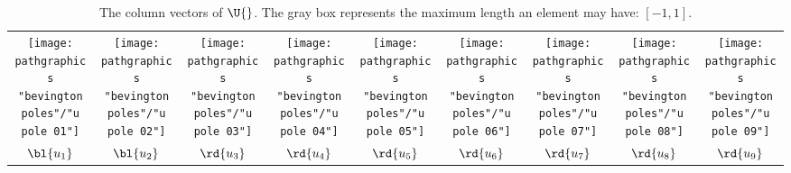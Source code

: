 \begin{table}[t]
	\begin{center}
		\begin{tabular}{ccccccccc}
			\texttt{[image: \\pathgraphics "bevington poles"/"u pole 01"]} &
			\texttt{[image: \\pathgraphics "bevington poles"/"u pole 02"]} &
			\texttt{[image: \\pathgraphics "bevington poles"/"u pole 03"]} &
			\texttt{[image: \\pathgraphics "bevington poles"/"u pole 04"]} &
			\texttt{[image: \\pathgraphics "bevington poles"/"u pole 05"]} &
			\texttt{[image: \\pathgraphics "bevington poles"/"u pole 06"]} &
			\texttt{[image: \\pathgraphics "bevington poles"/"u pole 07"]} &
			\texttt{[image: \\pathgraphics "bevington poles"/"u pole 08"]} &
			\texttt{[image: \\pathgraphics "bevington poles"/"u pole 09"]} \\
		  $\bl{u_{1}}$ & $\bl{u_{2}}$ & $\rd{u_{3}}$ & $\rd{u_{4}}$ & $\rd{u_{5}}$ & $\rd{u_{6}}$ & $\rd{u_{7}}$ & $\rd{u_{8}}$ & $\rd{u_{9}}$
		\end{tabular}
	\end{center}
	\label{tab:bevington poles}
	\caption[The column vectors of $\U{}$]{The column vectors of $\U{}$. The gray box represents the maximum length an element may have: $[-1,1]$.}
\end{table}%

\endinput  %

